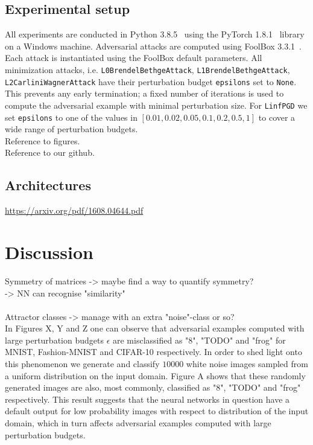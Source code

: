 \documentclass{article}
\begin{document}
\subsection{Experimental setup}
All experiments are conducted in Python 3.8.5~\cite{van1995python} using the PyTorch 1.8.1~\cite{pytorch} library on a Windows machine. Adversarial attacks are computed using FoolBox 3.3.1~\cite{rauber2017foolbox}. Each attack is instantiated using the FoolBox default parameters. All minimization attacks, i.e. \texttt{L0BrendelBethgeAttack}, \texttt{L1BrendelBethgeAttack}, \texttt{L2CarliniWagnerAttack} have their perturbation budget \texttt{epsilons} set to \texttt{None}. This prevents any early termination; a fixed number of iterations is used to compute the adversarial example with minimal perturbation size. For \texttt{LinfPGD} we set \texttt{epsilons} to one of the values in $[0.01, 0.02, 0.05, 0.1, 0.2, 0.5, 1]$ to cover a wide range of perturbation budgets.\\

\noindent Reference to figures.\\
Reference to our github.

\subsection{Architectures}
\url{https://arxiv.org/pdf/1608.04644.pdf}


\section{Discussion}
Symmetry of matrices -> maybe find a way to quantify symmetry?\\
-> NN can recognise "similarity"\\
\\

Attractor classes -> manage with an extra "noise"-class or so?\\


In Figures X, Y and Z one can observe that adversarial examples computed with large perturbation budgets $\epsilon$ are misclassified as "8", "TODO" and "frog" for MNIST, Fashion-MNIST and CIFAR-10 respectively. In order to shed light onto this phenomenon we generate and classify $10000$ white noise images sampled from a uniform distribution on the input domain. Figure A shows that these randomly generated images are also, most commonly, classified as "8", "TODO" and "frog" respectively. This result suggests that the neural networks in question have a default output for low probability images with respect to distribution of the input domain, which in turn affects adversarial examples computed with large perturbation budgets.
\end{document}
